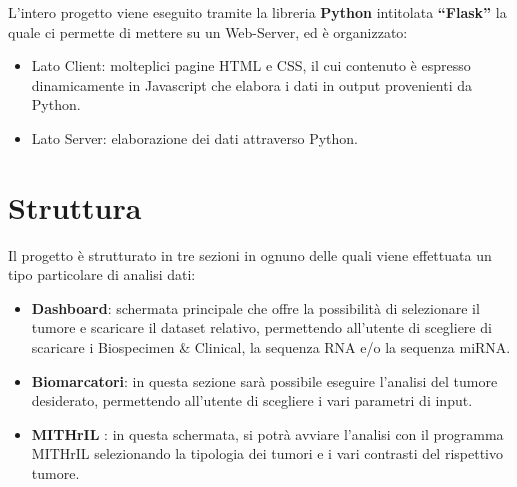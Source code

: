 \documentclass[10pt,a4paper]{report}
\newcommand{\virgolette}[1]{``#1''}
\begin{document}
L’intero progetto viene eseguito tramite la libreria \textbf{Python} intitolata \textbf{\virgolette{Flask}} la quale ci permette di mettere su un Web-Server, ed è organizzato:
\begin{itemize}
\item Lato Client: molteplici pagine HTML e CSS, il cui contenuto è espresso dinamicamente in Javascript che elabora i dati in output provenienti da Python.
\item Lato Server: elaborazione dei dati attraverso Python.
\end{itemize}
\newpage
\section{Struttura}
Il progetto è strutturato in tre sezioni in ognuno delle quali viene effettuata un tipo particolare di analisi dati:
\begin{itemize}
\item \textbf{Dashboard}: schermata principale che offre la possibilità di selezionare il tumore e scaricare il dataset relativo, permettendo all’utente di scegliere di scaricare i Biospecimen \& Clinical, la sequenza RNA e/o la sequenza miRNA.
\item \textbf{Biomarcatori}: in questa sezione sarà possibile eseguire l’analisi del tumore desiderato, permettendo all’utente di scegliere i vari parametri di input.
\item \textbf{MITHrIL} : in questa schermata, si potrà avviare l’analisi con il programma MITHrIL selezionando la tipologia dei tumori e i vari contrasti del rispettivo tumore.
\end{itemize}
\end{document}

